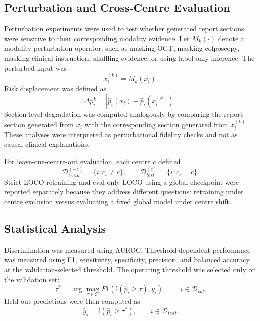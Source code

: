 \subsection{Perturbation and Cross-Centre Evaluation}
\label{subsec:methods_perturbation_loco}

Perturbation experiments were used to test whether generated report sections were sensitive to their corresponding modality evidence. Let \(M_k(\cdot)\) denote a modality perturbation operator, such as masking OCT, masking colposcopy, masking clinical instruction, shuffling evidence, or using label-only inference. The perturbed input was
\begin{equation}
x_i^{(k)}=M_k(x_i).
\end{equation}
Risk displacement was defined as
\begin{equation}
\Delta p_i^{k}=|\hat{p}_i(x_i)-\hat{p}_i(x_i^{(k)})|.
\end{equation}
Section-level degradation was computed analogously by comparing the report section generated from \(x_i\) with the corresponding section generated from \(x_i^{(k)}\). These analyses were interpreted as perturbational fidelity checks and not as causal clinical explanations.

For leave-one-centre-out evaluation, each centre \(c\) defined
\begin{equation}
\mathcal{D}_{train}^{(-c)}=\{i:c_i\neq c\},
\qquad
\mathcal{D}_{test}^{(c)}=\{i:c_i=c\}.
\end{equation}
Strict LOCO retraining and eval-only LOCO using a global checkpoint were reported separately because they address different questions: retraining under centre exclusion versus evaluating a fixed global model under centre shift.

\subsection{Statistical Analysis}
\label{subsec:methods_statistics}

Discrimination was measured using AUROC. Threshold-dependent performance was measured using F1, sensitivity, specificity, precision, and balanced accuracy at the validation-selected threshold. The operating threshold was selected only on the validation set:
\begin{equation}
\tau^{*}
=
\arg\max_{\tau\in\mathcal{T}}
F1\left(\mathbb{I}(\hat{p}_i\geq\tau),y_i\right),
\qquad i\in\mathcal{D}_{val}.
\end{equation}
Held-out predictions were then computed as
\begin{equation}
\hat{y}_i=\mathbb{I}(\hat{p}_i\geq\tau^{*}),
\qquad i\in\mathcal{D}_{test}.
\end{equation}

